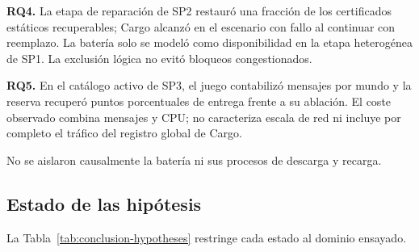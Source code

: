 \textbf{RQ4.} La etapa de reparación de SP2 restauró una fracción
\SPSixConditionalRestore{} de los \SPSixRecoverableWorlds{} certificados
estáticos recuperables; Cargo alcanzó \CargoEtwoEFailureSuccess{} en el escenario
con fallo al continuar con reemplazo. La batería solo se modeló como
disponibilidad en la etapa heterogénea de SP1. La exclusión lógica no evitó
bloqueos congestionados.

\textbf{RQ5.} En el catálogo activo de SP3, el juego contabilizó
\SPSevenProposedMessages{} mensajes por mundo y la reserva recuperó
\SPSevenHOneEffectPP{} puntos porcentuales de entrega frente a su ablación. El
coste observado combina mensajes y CPU; no caracteriza escala de red ni incluye
por completo el tráfico del registro global de Cargo.

No se aislaron causalmente la batería ni sus procesos de descarga y recarga.

\subsection{Estado de las hipótesis}

La Tabla~\ref{tab:conclusion-hypotheses} restringe cada estado al dominio ensayado.

